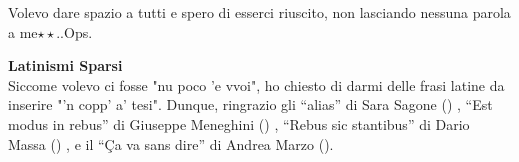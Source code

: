 \documentclass[a4paper,10pt, oneside]{book} %
\theoremstyle{definition}
\begin{document}
Volevo dare spazio a tutti e spero di esserci riuscito, non lasciando nessuna parola a me$\star \star$..Ops.

\textbf{Latinismi Sparsi}
\\Siccome volevo ci fosse "nu poco 'e vvoi", ho chiesto di darmi delle frasi latine da inserire "'n copp' a' tesi". Dunque, ringrazio gli 
``alias'' di Sara Sagone ()
, ``Est modus in rebus'' di Giuseppe Meneghini ()
, ``Rebus sic stantibus'' di Dario Massa ()
, e il ``Ça va sans dire'' di Andrea Marzo ().




\end{document}

